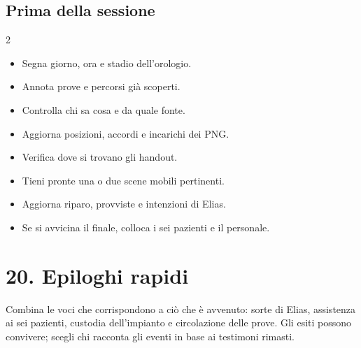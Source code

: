 \documentclass[11pt,a4paper]{article}
\newcommand{\tickbox}{\ding{113}}
\begin{document}
\subsection{Prima della sessione}
\begin{multicols}{2}
\begin{itemize}[label=\tickbox]
\item Segna giorno, ora e stadio dell'orologio.
\item Annota prove e percorsi già scoperti.
\item Controlla chi sa cosa e da quale fonte.
\item Aggiorna posizioni, accordi e incarichi dei PNG.
\item Verifica dove si trovano gli handout.
\item Tieni pronte una o due scene mobili pertinenti.
\item Aggiorna riparo, provviste e intenzioni di Elias.
\item Se si avvicina il finale, colloca i sei pazienti e il personale.
\end{itemize}
\end{multicols}

\section{20. Epiloghi rapidi}

Combina le voci che corrispondono a ciò che è avvenuto: sorte di Elias, assistenza ai sei pazienti, custodia dell'impianto e circolazione delle prove. Gli esiti possono convivere; scegli chi racconta gli eventi in base ai testimoni rimasti.
\end{document}
